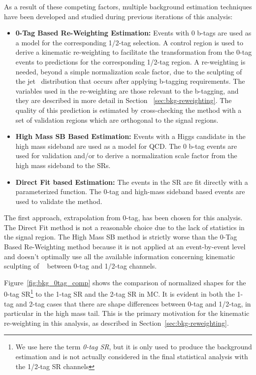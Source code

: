 As a result of these competing factors, multiple background estimation techniques have been developed and studied during previous iterations of this analysis:
\begin{itemize}
    \itemsep0em 
\item \textbf{0-Tag Based Re-Weighting Estimation:}
    Events with 0 b-tags are used as a model for the corresponding 1/2-tag selection.
    A control region is used to derive a kinematic re-weighting to facilitate the transformation from the 0-tag events to predictions for the corresponding 1/2-tag region.
    A re-weighting is needed, beyond a simple normalization scale factor, due to the sculpting of the jet \pt\ distribution that occurs after applying b-tagging requirements.
    The variables used in the re-weighting are those relevant to the b-tagging, and they are described in more detail in Section ~\ref{sec:bkg-reweighting}.
    The quality of this prediction is estimated by cross-checking the method with a set of validation regions which are orthogonal to the signal regions.

\item \textbf{High Mass SB Based Estimation:}
    Events with a Higgs candidate in the high mass sideband are used as a model for QCD.
    The 0 b-tag events are used for validation and/or to derive a normalization scale factor from the high mass sideband to the SRs.

\item \textbf{Direct Fit based Estimation:}
    The events in the SR are fit directly with a parameterized function.
    The 0-tag and high-mass sideband based events are used to validate the method.
\end{itemize}

The first approach, extrapolation from 0-tag, has been chosen for this analysis.
The Direct Fit method is not a reasonable choice due to the lack of statistics in the signal region.
The High Mass SB method is strictly worse than the 0-Tag Based Re-Weighting method because it is not applied at an event-by-event level and doesn't optimally use all the available information concerning kinematic sculpting of \mvh~ between 0-tag and 1/2-tag channels.

Figure~\ref{fig:bkg_0tag_comp} shows the comparison of normalized shapes for the 0-tag SR\footnote{We use here the term \textit{0-tag SR}, but it is only used to produce the background estimation and is not actually considered in the final statistical analysis with the 1/2-tag SR channels} to the 1-tag SR and the 2-tag SR in MC.
It is evident in both the 1-tag and 2-tag cases that there are shape differences between 0-tag and 1/2-tag, in particular in the high mass tail.
This is the primary motivation for the kinematic re-weighting in this analysis, as described in Section~\ref{sec:bkg-reweighting}.

